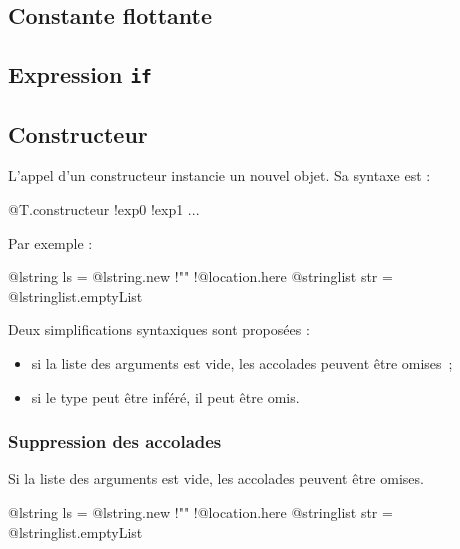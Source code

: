 \subsection{Constante flottante}

\subsection{Expression \texttt{if}}










\subsection{Constructeur}

L'appel d'un constructeur instancie un nouvel objet. Sa syntaxe est :

\begin{galgas3box}
@T.constructeur {!exp0 !exp1 ...}
\end{galgas3box}

Par exemple :
\begin{galgas3}
@lstring ls = @lstring.new {!"" !@location.here{}}
@stringlist str = @lstringlist.emptyList {}
\end{galgas3}

Deux simplifications syntaxiques sont proposées :
\begin{itemize}
  \item si la liste des arguments est vide, les accolades peuvent être omises~;
  \item si le type peut être inféré, il peut être omis.
\end{itemize}


\subsubsection{Suppression des accolades}

Si la liste des arguments est vide, les accolades peuvent être omises.

\begin{galgas3}
@lstring ls = @lstring.new {!"" !@location.here}
@stringlist str = @lstringlist.emptyList
\end{galgas3}




